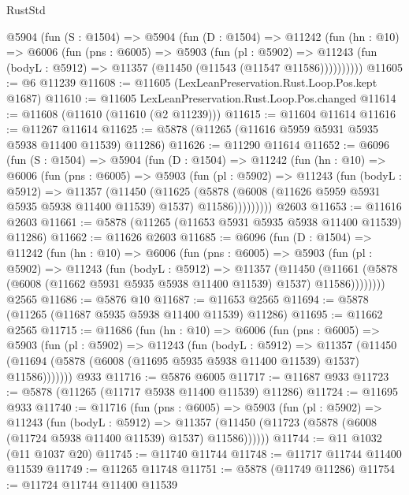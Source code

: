 \begin{lexlean}{RustStd}
\begin{coremodule}
    @5904
      (fun (S : @1504) =>
      @5904
        (fun (D : @1504) =>
        @11242
          (fun (hn : @10) =>
          @6006
            (fun (pns : @6005) =>
            @5903
              (fun (pl : @5902) =>
              @11243 (fun (bodyL : @5912) => @11357 (@11450 (@11543 (@11547 @11586))))))))))
@11605 := @6 @11239
@11608 := @11605 (LexLeanPreservation.Rust.Loop.Pos.kept @1687)
@11610 := @11605 LexLeanPreservation.Rust.Loop.Pos.changed
@11614 := @11608 (@11610 (@11610 (@2 @11239)))
@11615 := @11604 @11614
@11616 := @11267 @11614
@11625 := @5878 (@11265 (@11616 @5959 @5931 @5935 @5938 @11400 @11539) @11286)
@11626 := @11290 @11614
@11652 := @6096
    (fun (S : @1504) =>
    @5904
      (fun (D : @1504) =>
      @11242
        (fun (hn : @10) =>
        @6006
          (fun (pns : @6005) =>
          @5903
            (fun (pl : @5902) =>
            @11243
              (fun (bodyL : @5912) =>
              @11357
                (@11450
                  (@11625
                    (@5878
                      (@6008 (@11626 @5959 @5931 @5935 @5938 @11400 @11539) @1537)
                      @11586)))))))))
    @2603
@11653 := @11616 @2603
@11661 := @5878 (@11265 (@11653 @5931 @5935 @5938 @11400 @11539) @11286)
@11662 := @11626 @2603
@11685 := @6096
    (fun (D : @1504) =>
    @11242
      (fun (hn : @10) =>
      @6006
        (fun (pns : @6005) =>
        @5903
          (fun (pl : @5902) =>
          @11243
            (fun (bodyL : @5912) =>
            @11357
              (@11450
                (@11661 (@5878 (@6008 (@11662 @5931 @5935 @5938 @11400 @11539) @1537) @11586))))))))
    @2565
@11686 := @5876 @10
@11687 := @11653 @2565
@11694 := @5878 (@11265 (@11687 @5935 @5938 @11400 @11539) @11286)
@11695 := @11662 @2565
@11715 := @11686
    (fun (hn : @10) =>
    @6006
      (fun (pns : @6005) =>
      @5903
        (fun (pl : @5902) =>
        @11243
          (fun (bodyL : @5912) =>
          @11357
            (@11450 (@11694 (@5878 (@6008 (@11695 @5935 @5938 @11400 @11539) @1537) @11586)))))))
    @933
@11716 := @5876 @6005
@11717 := @11687 @933
@11723 := @5878 (@11265 (@11717 @5938 @11400 @11539) @11286)
@11724 := @11695 @933
@11740 := @11716
    (fun (pns : @6005) =>
    @5903
      (fun (pl : @5902) =>
      @11243
        (fun (bodyL : @5912) =>
        @11357 (@11450 (@11723 (@5878 (@6008 (@11724 @5938 @11400 @11539) @1537) @11586))))))
@11744 := @11 @1032 (@11 @1037 @20)
@11745 := @11740 @11744
@11748 := @11717 @11744 @11400 @11539
@11749 := @11265 @11748
@11751 := @5878 (@11749 @11286)
@11754 := @11724 @11744 @11400 @11539

\end{coremodule}
\end{lexlean}
